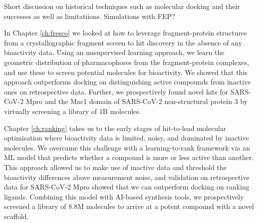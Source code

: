 

Short discussion on historical techniques such as molecular docking and their successes as well as limitatiions. Simulations with FEP?

In Chapter \ref{ch:fresco} we looked at how to leverage fragment-protein structures from a crystallographic fragment screen to hit discovery in the absence of any bioactivity data. Using an unsupervised learning approach, we learn the geometric distribution of pharmacophores from the fragment-protein complexes, and use these to screen potential molecules for bioactivity. We showed that this approach outperforms docking on distinguishing active compounds from inactive ones on retrospective data. Further, we prospectively found novel hits for SARS-CoV-2 Mpro and the Mac1 domain of SARS-CoV-2 non-structural protein 3 by virtually screening a library of 1B molecules.

Chapter \ref{ch:ranking} takes us to the early stages of hit-to-lead molecular optimisation where bioactivity data is limited, noisy, and dominated by inactive molecules. We overcame this challenge with a learning-to-rank framework via an ML model that predicts whether a compound is more or less active than another. This approach allowed us to make use of inactive data and threshold the bioactivity differences above measurement noise, and validation on retrospective data for SARS-CoV-2 Mpro showed that we can outperform docking on ranking ligands. Combining this model with AI-based synthesis tools, we prospectively screened a library of 8.8M molecules to arrive at a potent compound with a novel scaffold.

